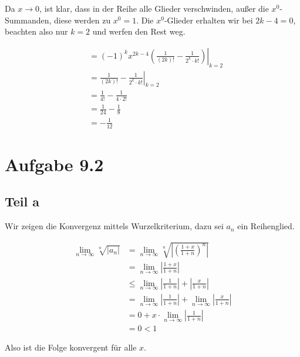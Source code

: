 \documentclass[a4paper,german,12pt,smallheadings]{scrartcl}
\begin{document}
Da $x \to 0$, ist klar, dass in der Reihe alle Glieder verschwinden, außer die
$x^0$-Summanden, diese werden zu $x^0 = 1$. Die $x^0$-Glieder erhalten wir bei
$2k-4 = 0$, beachten also nur $k=2$ und werfen den Rest weg.

\begin{align*}
   &= \left.(-1)^k x^{2k-4} \left(\frac{1}{(2k)!} - \frac{1}{2^k \cdot k!}\right)\right|_{k=2} \\
   &= \left.\frac{1}{(2k)!} - \frac{1}{2^k \cdot k!}\right|_{k=2} \\
   &= \frac{1}{4!} - \frac{1}{4\cdot 2!} \\
   &= \frac{1}{24} - \frac{1}{8} \\
   &= -\frac{1}{12}
\end{align*}

\section*{Aufgabe 9.2}
\subsection*{Teil a}

Wir zeigen die Konvergenz mittels Wurzelkriterium, dazu sei $a_n$ ein
Reihenglied.

\begin{align*}
  \lim_{n \to \infty} \sqrt[n]{|a_n|} &= \lim_{n \to \infty} \sqrt[n]{\left|\left(\frac{1+x}{1+n}\right)^n\right|} \\
  &= \lim_{n \to \infty} \left|\frac{1+x}{1+n}\right| \\
  &\le \lim_{n \to \infty} \left|\frac{1}{1+n}\right| + \left|\frac{x}{1+n}\right|\\
  &= \lim_{n \to \infty} \left|\frac{1}{1+n}\right| + \lim_{n \to \infty} \left|\frac{x}{1+n}\right|\\
  &= 0 + x \cdot \lim_{n \to \infty} \left|\frac{1}{1+n}\right|\\
  &= 0 < 1
\end{align*}

Also ist die Folge konvergent für alle $x$.
\end{document}
